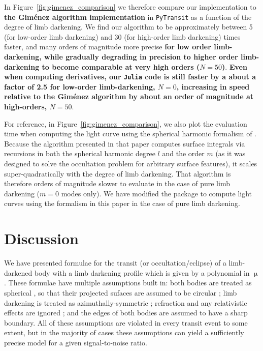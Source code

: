 \documentclass[modern,trackchanges]{aastex63}
\begin{document}
In Figure~\ref{fig:gimenez_comparison} we therefore compare our implementation
to {\bf the Gim\'enez algorithm implementation} in \texttt{PyTransit} as a function 
of the degree of limb darkening.
We find our algorithm to be approximately between 5 (for low-order limb darkening)
and 30 (for high-order limb darkening) times faster, and many orders of magnitude
more precise {\bf for low order limb-darkening, while gradually degrading in precision
to higher order limb-darkening to become comparable at very high orders ($N=50$)}. 
{\bf Even when computing derivatives, our \texttt{Julia} code is still faster by
a about a factor of 2.5 for low-order limb-darkening, $N=0$, increasing in
speed relative to the Gim\'enez algorithm by about an order of magnitude at high-orders,
$N=50$}.

For reference, in Figure~\ref{fig:gimenez_comparison},
we also plot the evaluation time when computing the light curve using the
spherical harmonic formalism of \cite{starry}. Because the algorithm presented
in that paper computes surface integrals via recursions in both the
spherical harmonic degree $l$ and the order $m$ (as it was designed to
solve the occultation problem for arbitrary surface features),
it scales super-quadratically with the degree of limb darkening. That
algorithm is therefore orders of magnitude slower
to evaluate in the case of pure limb darkening ($m=0$ modes only). We have
modified the \starry package to compute light curves
using the formalism in this paper in the case of pure limb darkening.

\section{Discussion}
\label{sec:discussion}

We have presented formulae for the transit (or occultation/eclipse) of a
limb-darkened body with a limb darkening profile which is given by a polynomial
in $\upmu$.  These formulae have multiple assumptions built in:  both bodies
are treated as spherical \citep[but see][]{Seager2002,Hui2002}, so that their projected
sufaces are assumed to be circular \citep[but see][]{Barnes2003,Barnes2004,Barnes2009b,
DobbsDixon2012};  limb darkening is treated as azimuthally-symmetric \citep[but see][]{Barnes2009a};
refraction and any relativistic effects are ignored \citep[but see][]{Sidis2010};
and the edges of both bodies are assumed to have a sharp boundary.
All of these assumptions are violated in every transit event to some extent,
but in the majority of cases these assumptions can yield a sufficiently precise model for
a given signal-to-noise ratio.
\end{document}
